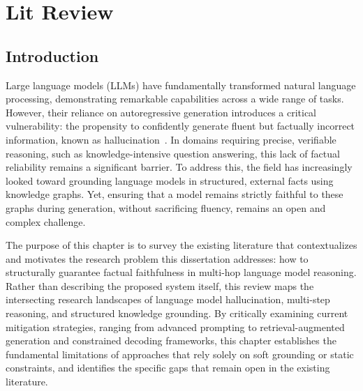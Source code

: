 
\chapter{Lit Review}

\section{Introduction}

Large language models (LLMs) have fundamentally transformed natural language processing, demonstrating remarkable capabilities across a wide range of tasks. However, their reliance on autoregressive generation introduces a critical vulnerability: the propensity to confidently generate fluent but factually incorrect information, known as hallucination~\citep{ji2023survey}. In domains requiring precise, verifiable reasoning, such as knowledge-intensive question answering, this lack of factual reliability remains a significant barrier. To address this, the field has increasingly looked toward grounding language models in structured, external facts using knowledge graphs. Yet, ensuring that a model remains strictly faithful to these graphs during generation, without sacrificing fluency, remains an open and complex challenge.

The purpose of this chapter is to survey the existing literature that contextualizes and motivates the research problem this dissertation addresses: how to structurally guarantee factual faithfulness in multi-hop language model reasoning. Rather than describing the proposed system itself, this review maps the intersecting research landscapes of language model hallucination, multi-step reasoning, and structured knowledge grounding. By critically examining current mitigation strategies, ranging from advanced prompting to retrieval-augmented generation and constrained decoding frameworks, this chapter establishes the fundamental limitations of approaches that rely solely on soft grounding or static constraints, and identifies the specific gaps that remain open in the existing literature.

